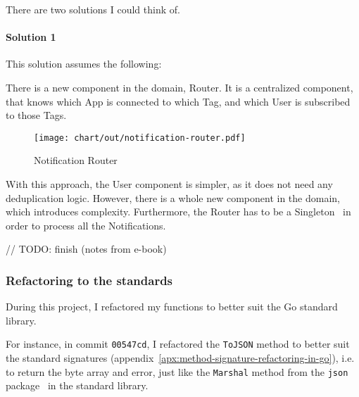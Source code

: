 There are two solutions I could think of.

\paragraph*{Solution 1}

This solution assumes the following:

There is a new component in the domain, Router.
It is a centralized component,
that knows which App is connected to which Tag,
and which User is subscribed to those Tags.

\begin{figure}[h]
  \centering
  \texttt{[image: chart/out/notification-router.pdf]}
  \caption{Notification Router}
  \label{fig:notification-router}
\end{figure}

With this approach,
the User component is simpler,
as it does not need any deduplication logic.
However, there is a whole new component
in the domain, which introduces complexity.
Furthermore, the Router has to be
a Singleton~\cite[pp.~127-134]{gamma_design_1994}
in order to process all the Notifications.

// TODO: finish (notes from e-book)

\subsubsection{Refactoring to the standards}\label{sec:refactoring-to-the-standards}

During this project,
I refactored my functions to better suit
the Go standard library.

For instance,
in commit \texttt{00547cd},
I refactored the \texttt{ToJSON} method
to better suit the standard signatures
(appendix~\ref{apx:method-signature-refactoring-in-go}),
i.e. to return the byte array and error,
just like the \texttt{Marshal} method
from the \texttt{json} package~\cite{cox_json_2022}
in the standard library.

